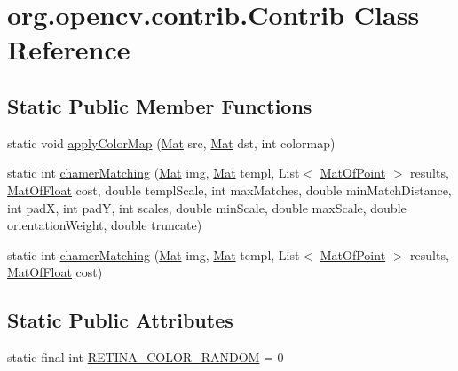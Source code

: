 \hypertarget{classorg_1_1opencv_1_1contrib_1_1_contrib}{}\section{org.\+opencv.\+contrib.\+Contrib Class Reference}
\label{classorg_1_1opencv_1_1contrib_1_1_contrib}
\subsection*{Static Public Member Functions}
\begin{DoxyCompactItemize}
\item 
static void \mbox{\hyperlink{classorg_1_1opencv_1_1contrib_1_1_contrib_a58729ce6ba4fd94066f5f6b18ae2543b}{apply\+Color\+Map}} (\mbox{\hyperlink{classorg_1_1opencv_1_1core_1_1_mat}{Mat}} src, \mbox{\hyperlink{classorg_1_1opencv_1_1core_1_1_mat}{Mat}} dst, int colormap)
\item 
static int \mbox{\hyperlink{classorg_1_1opencv_1_1contrib_1_1_contrib_ac1cce3fcb7051272fa74b7c6c043d3dc}{chamer\+Matching}} (\mbox{\hyperlink{classorg_1_1opencv_1_1core_1_1_mat}{Mat}} img, \mbox{\hyperlink{classorg_1_1opencv_1_1core_1_1_mat}{Mat}} templ, List$<$ \mbox{\hyperlink{classorg_1_1opencv_1_1core_1_1_mat_of_point}{Mat\+Of\+Point}} $>$ results, \mbox{\hyperlink{classorg_1_1opencv_1_1core_1_1_mat_of_float}{Mat\+Of\+Float}} cost, double templ\+Scale, int max\+Matches, double min\+Match\+Distance, int padX, int padY, int scales, double min\+Scale, double max\+Scale, double orientation\+Weight, double truncate)
\item 
static int \mbox{\hyperlink{classorg_1_1opencv_1_1contrib_1_1_contrib_a591ee5c93fd25c8209189898e55f7026}{chamer\+Matching}} (\mbox{\hyperlink{classorg_1_1opencv_1_1core_1_1_mat}{Mat}} img, \mbox{\hyperlink{classorg_1_1opencv_1_1core_1_1_mat}{Mat}} templ, List$<$ \mbox{\hyperlink{classorg_1_1opencv_1_1core_1_1_mat_of_point}{Mat\+Of\+Point}} $>$ results, \mbox{\hyperlink{classorg_1_1opencv_1_1core_1_1_mat_of_float}{Mat\+Of\+Float}} cost)
\end{DoxyCompactItemize}
\subsection*{Static Public Attributes}
\begin{DoxyCompactItemize}
\item 
static final int \mbox{\hyperlink{classorg_1_1opencv_1_1contrib_1_1_contrib_aa29c053a83a2ef41e1d07a0eba03bb91}{R\+E\+T\+I\+N\+A\+\_\+\+C\+O\+L\+O\+R\+\_\+\+R\+A\+N\+D\+OM}} = 0
\end{DoxyCompactItemize}


